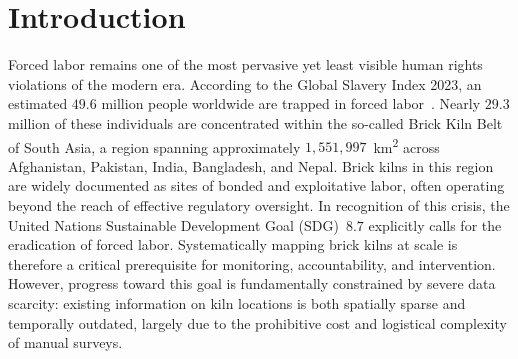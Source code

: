 \documentclass{article}
\theoremstyle{plain}
\theoremstyle{definition}
\theoremstyle{remark}
\begin{document}
\begin{abstract}
  Brick kilns are a major source of air pollution and forced labor in South Asia, yet large-scale monitoring remains limited by sparse and outdated ground data. We study brick kiln detection at scale using high-resolution satellite imagery and curate a multi-city zoom-20 resolution (0.149~m\,pixel$^{-1}$) dataset comprising over $1.3$ million image tiles across five regions in South and Central Asia. We propose ClimateGraph, a region-adaptive graph-based model that captures spatial and directional structure in kiln layouts, and evaluate it against established graph learning baselines. In parallel, we assess a remote sensing–based detection pipeline and benchmark it against recent foundation models for satellite imagery. Our results highlight complementary strengths across graph, foundation, and remote sensing approaches, providing practical guidance for scalable brick kiln monitoring from satellite imagery.
\end{abstract}

\section{Introduction}
Forced labor remains one of the most pervasive yet least visible human rights violations of the modern era. According to the Global Slavery Index 2023, an estimated $49.6$ million people worldwide are trapped in forced labor~\cite{walk2023global}. Nearly $29.3$ million of these individuals are concentrated within the so-called Brick Kiln Belt of South Asia, a region spanning approximately $1,551,997$~km\textsuperscript{2} across Afghanistan, Pakistan, India, Bangladesh, and Nepal. Brick kilns in this region are widely documented as sites of bonded and exploitative labor, often operating beyond the reach of effective regulatory oversight. In recognition of this crisis, the United Nations Sustainable Development Goal (SDG)~$8.7$ explicitly calls for the eradication of forced labor. Systematically mapping brick kilns at scale is therefore a critical prerequisite for monitoring, accountability, and intervention. However, progress toward this goal is fundamentally constrained by severe data scarcity: existing information on kiln locations is both spatially sparse and temporally outdated, largely due to the prohibitive cost and logistical complexity of manual surveys.
\end{document}
